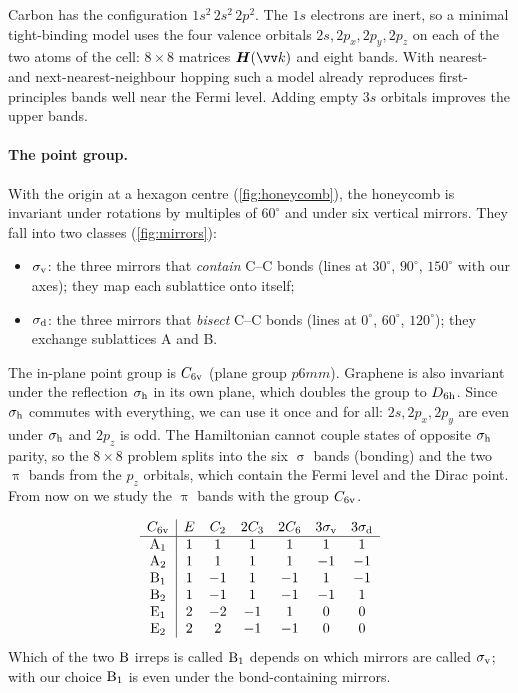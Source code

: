 Carbon has the configuration $1s^2\,2s^2\,2p^2$. The $1s$ electrons are inert, so a
minimal tight-binding model uses the four valence orbitals $2s,2p_x,2p_y,2p_z$ on each
of the two atoms of the cell: $8\times8$ matrices $\mat{H}(\vec{k})$ and eight bands.
With nearest- and next-nearest-neighbour hopping such a model already reproduces
first-principles bands well near the Fermi level. Adding empty $3s$ orbitals improves
the upper bands.

\paragraph{The point group.} With the origin at a hexagon centre (\cref{fig:honeycomb}),
the honeycomb is invariant under rotations by multiples of $60^\circ$ and under six
vertical mirrors. They fall into two classes (\cref{fig:mirrors}):
\begin{itemize}
\item $\sigma_{\mathrm{v}}$: the three mirrors that \emph{contain} C--C bonds (lines at $30^\circ$,
      $90^\circ$, $150^\circ$ with our axes); they map each sublattice onto itself;
\item $\sigma_{\mathrm{d}}$: the three mirrors that \emph{bisect} C--C bonds (lines at $0^\circ$,
      $60^\circ$, $120^\circ$); they exchange sublattices A and B.
\end{itemize}
The in-plane point group is $C_{6\mathrm{v}}$ (plane group $p6mm$). Graphene is also invariant
under the reflection $\sigma_{\mathrm{h}}$ in its own plane, which doubles the group to $D_{6\mathrm{h}}$.
Since $\sigma_{\mathrm{h}}$ commutes with everything, we can use it once and for all:
$2s,2p_x,2p_y$ are even under $\sigma_{\mathrm{h}}$ and $2p_z$ is odd. The Hamiltonian cannot couple
states of opposite $\sigma_{\mathrm{h}}$ parity, so the $8\times8$ problem splits into the six
$\upsigma$ bands (bonding) and the two $\uppi$ bands from the $p_z$ orbitals, which contain
the Fermi level and the Dirac point. From now on we study the $\uppi$ bands with the group
$C_{6\mathrm{v}}$.

\begin{equation}\label{eq:C6vtable}
\begin{array}{c|cccccc}
C_{6\mathrm{v}} & E & C_2 & 2C_3 & 2C_6 & 3\sigma_{\mathrm{v}} & 3\sigma_{\mathrm{d}}\\\hline
\mathrm{A}_1 & 1&1&1&1&1&1\\
\mathrm{A}_2 & 1&1&1&1&-1&-1\\
\mathrm{B}_1 & 1&-1&1&-1&1&-1\\
\mathrm{B}_2 & 1&-1&1&-1&-1&1\\
\mathrm{E}_1 & 2&-2&-1&1&0&0\\
\mathrm{E}_2 & 2&2&-1&-1&0&0
\end{array}
\end{equation}
Which of the two $\mathrm{B}$ irreps is called $\mathrm{B}_1$ depends on which mirrors are
called $\sigma_{\mathrm{v}}$; with our choice $\mathrm{B}_1$ is even under the bond-containing mirrors.

